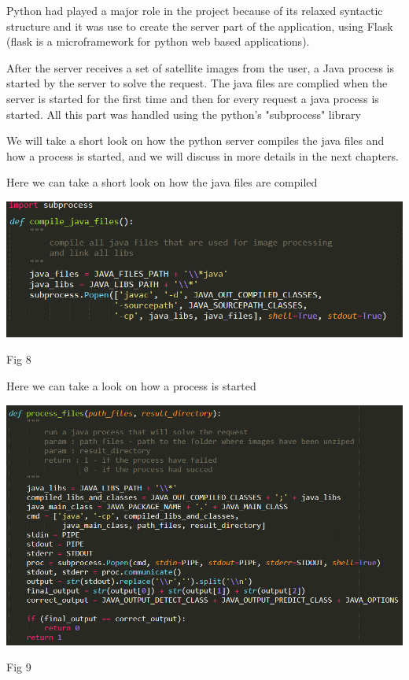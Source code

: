 \documentclass[12pt, a4paper]{report}
\begin{document}
Python had played a major role in the project because of its relaxed syntactic structure and it was use to create the server part of the application, using Flask (flask is a microframework for python web based applications).
\par 

After the server receives a set of satellite images from the user, a Java process is started by the server to solve the request. The java files are complied when the server is started for the first time and then for every request a java process is started. All this part was handled using the python's "subprocess" library
\par
\medskip

We will take a short look on how the python server compiles the java files and how a process is started, and we will discuss in more details in the next chapters.
\medskip

Here we can take a short look on how the java files are compiled
\par
\bigskip
\includegraphics[scale=0.8, center]{python_call_java_1.png}
\begin{center}
Fig 8
\end{center}

\newpage

Here we can take a look on how a process is started
\par
\medskip
\includegraphics[scale=0.7, center]{python_call_java_2.png}
\begin{center}
Fig 9
\end{center}
\end{document}

